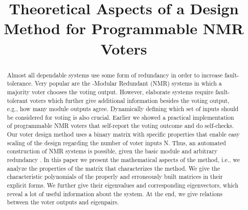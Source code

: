 \documentclass[technote, a4paper, onecolumn]{IEEEtran}  \newcommand{\avtor}{Aleksandar Simevski}
\newcommand{\naslov}{Theoretical Aspects of a Design Method for Programmable NMR Voters}
\begin{document}
\title{\naslov} 

\author{

\and 
\vspace{0.05in}
\IEEEauthorblockN{\avtor}



}




\maketitle

\begin{abstract} 

Almost all dependable systems use some form of redundancy in order to increase fault-tolerance. Very popular are the -Modular Redundant (NMR) systems in which a majority voter chooses the voting output. However, elaborate systems require fault-tolerant voters which further give additional information besides the voting output, e.g., how many module outputs agree. Dynamically defining which set of inputs should be considered for voting is also crucial. Earlier we showed a practical implementation of programmable NMR voters that self-report the voting outcome and do self-checks. Our voter design method uses a binary matrix with specific properties that enable easy scaling of the design regarding the number of voter inputs N. Thus, an automated construction of NMR systems is possible, given the basic module and arbitrary redundancy . In this paper we present the mathematical aspects of the method, i.e., we analyze the properties of the matrix that characterizes the method. We give the characteristic polynomials of the properly and erroneously built matrices in their explicit forms. We further give their eigenvalues and corresponding eigenvectors, which reveal a lot of useful information about the system. At the end, we give relations between the voter outputs and eigenpairs.

\end{abstract} \IEEEpeerreviewmaketitle
\end{document}
